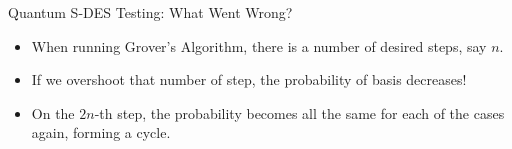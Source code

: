 \documentclass{beamer}
\begin{document}
    \begin{frame}{Quantum S-DES Testing: What Went Wrong?}
        \begin{itemize}
            \item When running Grover's Algorithm, there is a number of desired steps, say $n$.
            \item If we overshoot that number of step, the probability of basis decreases!
            \item On the $2n$-th step, the probability becomes all the same for each of the cases again, forming a cycle.
        \end{itemize}
    \end{frame}
\end{document}
